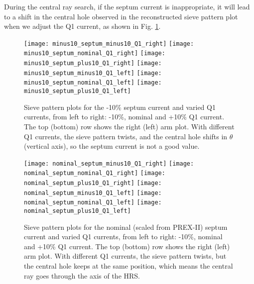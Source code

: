 During the central ray search, if the septum current is inappropriate, 
it will lead to a shift in the central hole observed in the reconstructed sieve pattern plot when we 
adjust the Q1 current, as shown in Fig. \ref{fig:central_ray_0}.
\begin{figure}[!h]
    \centering
    \texttt{[image: minus10\_septum\_minus10\_Q1\_right]}
    \texttt{[image: minus10\_septum\_nominal\_Q1\_right]}
    \texttt{[image: minus10\_septum\_plus10\_Q1\_right]}
    \texttt{[image: minus10\_septum\_minus10\_Q1\_left]}
    \texttt{[image: minus10\_septum\_nominal\_Q1\_left]}
    \texttt{[image: minus10\_septum\_plus10\_Q1\_left]}
    \caption[Sieve pattern plots for the -10\% septum current]
    {Sieve pattern plots for the -10\% septum current
    and varied Q1 currents, from left to right: -10\%, nominal and +10\% Q1 current.
    The top (bottom) row shows the right (left) arm plot.  With different Q1 currents, 
    the sieve pattern twists, and the central hole 
    shifts in $\theta$ (vertical axis), so the septum current is not a good value.}
    \label{fig:central_ray_0}
\end{figure}

\begin{figure}[!h]
    \centering
    \texttt{[image: nominal\_septum\_minus10\_Q1\_right]}
    \texttt{[image: nominal\_septum\_nominal\_Q1\_right]}
    \texttt{[image: nominal\_septum\_plus10\_Q1\_right]}
    \texttt{[image: nominal\_septum\_minus10\_Q1\_left]}
    \texttt{[image: nominal\_septum\_nominal\_Q1\_left]}
    \texttt{[image: nominal\_septum\_plus10\_Q1\_left]}
    \caption[Sieve pattern plots for the nominal (scaled from PREX-II)]
    {Sieve pattern plots for the nominal (scaled from PREX-II) 
    septum current and varied Q1 currents, from left to right: -10\%, nominal and +10\% Q1 current.
    The top (bottom) row shows the right (left) arm plot. With different Q1 currents,
    the sieve pattern twists, but the central hole keeps at the same position, 
    which means the central ray goes through the axis of the HRS.}
    \label{fig:central_ray_1}
\end{figure}

